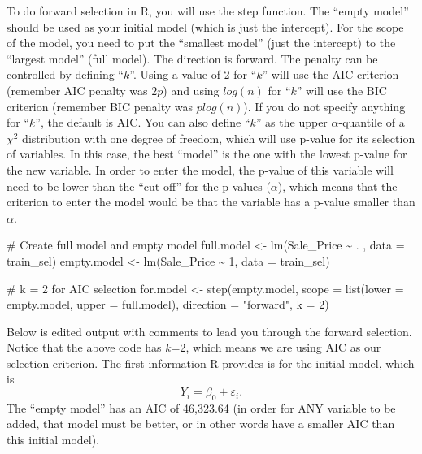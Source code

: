 \documentclass[
  letterpaper,
  DIV=11,
  numbers=noendperiod]{scrreprt}
\newenvironment{Shaded}{\begin{snugshade}}{\end{snugshade}}
\newcommand{\AttributeTok}[1]{\textcolor[rgb]{0.40,0.45,0.13}{#1}}
\newcommand{\CommentTok}[1]{\textcolor[rgb]{0.37,0.37,0.37}{#1}}
\newcommand{\DecValTok}[1]{\textcolor[rgb]{0.68,0.00,0.00}{#1}}
\newcommand{\FunctionTok}[1]{\textcolor[rgb]{0.28,0.35,0.67}{#1}}
\newcommand{\NormalTok}[1]{\textcolor[rgb]{0.00,0.23,0.31}{#1}}
\newcommand{\OtherTok}[1]{\textcolor[rgb]{0.00,0.23,0.31}{#1}}
\newcommand{\SpecialCharTok}[1]{\textcolor[rgb]{0.37,0.37,0.37}{#1}}
\newcommand{\StringTok}[1]{\textcolor[rgb]{0.13,0.47,0.30}{#1}}
\begin{document}
To do forward selection in R, you will use the step function. The
``empty model'' should be used as your initial model (which is just the
intercept). For the scope of the model, you need to put the ``smallest
model'' (just the intercept) to the ``largest model'' (full model). The
direction is forward. The penalty can be controlled by defining
``\(k\)''. Using a value of 2 for ``\(k\)'' will use the AIC criterion
(remember AIC penalty was \(2p\)) and using \(log(n)\) for ``\(k\)''
will use the BIC criterion (remember BIC penalty was \(plog(n)\)). If
you do not specify anything for ``\(k\)'', the default is AIC. You can
also define ``\(k\)'' as the upper \(\alpha\)-quantile of a \(\chi^{2}\)
distribution with one degree of freedom, which will use p-value for its
selection of variables. In this case, the best ``model'' is the one with
the lowest p-value for the new variable. In order to enter the model,
the p-value of this variable will need to be lower than the ``cut-off''
for the p-values (\(\alpha\)), which means that the criterion to enter
the model would be that the variable has a p-value smaller than
\(\alpha\).

\begin{Shaded}
\begin{Highlighting}[]
\CommentTok{\# Create full model and empty model}
\NormalTok{full.model }\OtherTok{\textless{}{-}} \FunctionTok{lm}\NormalTok{(Sale\_Price }\SpecialCharTok{\textasciitilde{}}\NormalTok{ . , }\AttributeTok{data =}\NormalTok{ train\_sel)}
\NormalTok{empty.model }\OtherTok{\textless{}{-}} \FunctionTok{lm}\NormalTok{(Sale\_Price }\SpecialCharTok{\textasciitilde{}} \DecValTok{1}\NormalTok{, }\AttributeTok{data =}\NormalTok{ train\_sel)}

\CommentTok{\# k = 2 for AIC selection}
\NormalTok{for.model }\OtherTok{\textless{}{-}} \FunctionTok{step}\NormalTok{(empty.model,}
                  \AttributeTok{scope =} \FunctionTok{list}\NormalTok{(}\AttributeTok{lower =}\NormalTok{ empty.model,}
                               \AttributeTok{upper =}\NormalTok{ full.model),}
                  \AttributeTok{direction =} \StringTok{"forward"}\NormalTok{, }\AttributeTok{k =} \DecValTok{2}\NormalTok{) }
\end{Highlighting}
\end{Shaded}

Below is edited output with comments to lead you through the forward
selection. Notice that the above code has \(k\)=2, which means we are
using AIC as our selection criterion. The first information R provides
is for the initial model, which is
\[Y_{i}=\beta_{0} + \varepsilon_{i}.\] The ``empty model'' has an AIC of
46,323.64 (in order for ANY variable to be added, that model must be
better, or in other words have a smaller AIC than this initial model).
\end{document}
